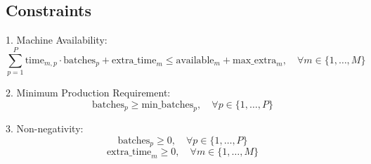 \documentclass{article}
\begin{document}
\subsection*{Constraints}
1. Machine Availability:
\[
\sum_{p=1}^{P} \text{time}_{m,p} \cdot \text{batches}_{p} + \text{extra\_time}_{m} \leq \text{available}_{m} + \text{max\_extra}_{m}, \quad \forall m \in \{1, \ldots, M\}
\]

2. Minimum Production Requirement:
\[
\text{batches}_{p} \geq \text{min\_batches}_{p}, \quad \forall p \in \{1, \ldots, P\}
\]

3. Non-negativity:
\[
\text{batches}_{p} \geq 0, \quad \forall p \in \{1, \ldots, P\}
\]
\[
\text{extra\_time}_{m} \geq 0, \quad \forall m \in \{1, \ldots, M\}
\]
\end{document}
